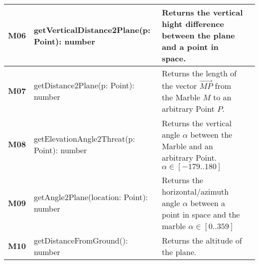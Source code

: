 \begin{xltabular}{\textwidth}{|M{1.2cm}|X|X|M{3cm}|}
  \textbf{M06} & {\ttfamily getVerticalDistance2Plane(p: Point): number} & Returns the vertical hight difference between the plane and a point in space. &  \\ \hline 
  \textbf{M07} & {\ttfamily getDistance2Plane(p: Point): number} & Returns the length of the vector $\vec{MP}$ from the Marble $M$ to an arbitrary Point $P$. &  \\ \hline 
  \textbf{M08} & {\ttfamily getElevationAngle2Threat(p: Point): number} & Returns the vertical angle $\alpha$ between the Marble and an arbitrary Point. $\alpha\in\left[-179..180\right]$ &  \\ \hline 
  \textbf{M09} & {\ttfamily getAngle2Plane(location: Point): number} & Returns the horizontal/azimuth angle $\alpha$ between a point in space and the marble $\alpha\in\left[0..359\right]$ &  \\ \hline 
  \textbf{M10} & {\ttfamily getDistanceFromGround(): number} & Returns the altitude of the plane. &  \\ \hline 
  
\end{xltabular} 
 \egroup 
 \color{default}